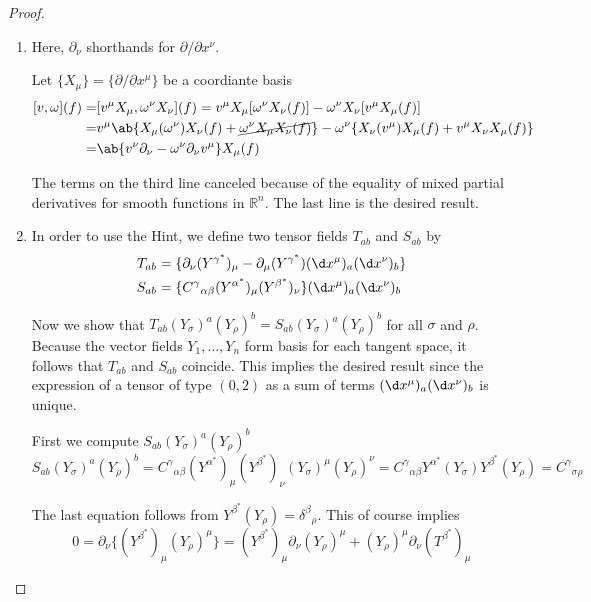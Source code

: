 \begin{proof}\leavevmode
\begin{enumerate}[label=(\alph*)]
    \item Here, $\partial_\nu$ shorthands for $\partial/\partial x^\nu$.

    Let $\{X_\mu\}=\{\partial/\partial x^\mu\}$ be a coordiante basis
    \[\begin{aligned}\relax
        [v,\omega](f)=&[v^\mu X_\mu, \omega^\nu X_\nu](f)=v^\mu X_\mu[\omega^\nu X_\nu(f)]-\omega^\nu X_\nu[v^\mu X_\mu(f)]\\
        =&v^\mu\ab\{X_\mu(\omega^\nu)X_\nu(f)+\cancel{\omega^\nu X_\mu X_\nu(f)}\}-\omega^\nu\{X_\nu(v^\mu)X_\mu(f)+v^\mu X_\nu X_\mu(f)\}\\
        =&\ab\{v^\nu\partial_\nu-\omega^\nu\partial_\nu v^\mu\}X_\mu(f)
    \end{aligned}
    \]

    The terms on the third line canceled because of the equality of mixed partial derivatives for smooth functions in $\mathbb{R}^n$. The last line is the desired result.
    \item In order to use the Hint, we define two tensor fields $T_{ab}$ and $S_{ab}$ by
    \[\begin{aligned}
        T_{ab}&=\{\partial_\nu(Y^{\gamma^*})_\mu-\partial_\mu(Y^{\gamma^*})(\d x^\mu)_a(\d x^\nu)_b\}\\
        S_{ab}&=\{{C^\gamma}_{\alpha\beta}(Y^{\alpha^*})_\mu(Y^{\beta^*})_\nu\}(\d x^\mu)_a(\d x^\nu)_b
    \end{aligned}\]

    Now we show that $T_{ab}(Y_\sigma)^a(Y_\rho)^b=S_{ab}(Y_\sigma)^a(Y_\rho)^b$ for all $\sigma$ and $\rho$. Because the vector fields $Y_1,\ldots,Y_n$ form basis for each tangent space, it follows that $T_{ab}$ and $S_{ab}$ coincide. This implies the desired result since the expression of a tensor of type $(0,2)$ as a sum of terms $(\d x^\mu)_a(\d x^\nu)_b$ is unique.

    First we compute $S_{ab}(Y_\sigma)^a(Y_\rho)^b$
    \[S_{ab}(Y_\sigma)^a(Y_\rho)^b={C^\gamma}_{\alpha\beta}(Y^{\alpha^*})_\mu(Y^{\beta^*})_\nu(Y_\sigma)^\mu(Y_\rho)^\nu={C^\gamma}_{\alpha\beta}Y^{\alpha^*}(Y_\sigma)Y^{\beta^*}(Y_\rho)={C^\gamma}_{\sigma\rho}\]

    The last equation follows from  $Y^{\beta^*}(Y_\rho)={\delta^\beta}_\rho$. This of course implies
    \[0=\partial_\nu\{(Y^{\beta^*})_\mu(Y_\rho)^\mu\}=(Y^{\beta^*})_\mu\partial_\nu(Y_\rho)^\mu+(Y_\rho)^\mu\partial_\nu(T^{\beta^*})_\mu\]


\end{enumerate}
\end{proof}
